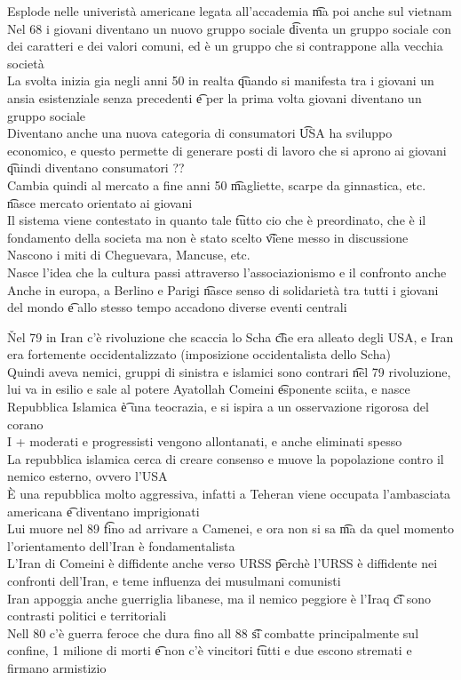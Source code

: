 \documentclass[12pt]{article}
\begin{document}
Esplode nelle univeristà americane legata all'accademia \t ma poi anche sul vietnam \\
Nel 68 i giovani diventano un nuovo gruppo sociale \t diventa un gruppo sociale con dei caratteri e dei valori comuni, ed è un gruppo che si contrappone alla vecchia società \\
La svolta inizia gia negli anni 50 in realta \t quando si manifesta tra i giovani un ansia esistenziale senza precedenti \t e per la prima volta giovani diventano un gruppo sociale \\
Diventano anche una nuova categoria di consumatori \t USA ha sviluppo economico, e questo permette di generare posti di lavoro che si aprono ai giovani \t quindi diventano consumatori ?? \\
Cambia quindi al mercato a fine anni 50 \t magliette, scarpe da ginnastica, etc. \t nasce mercato orientato ai giovani \\
Il sistema viene contestato in quanto tale \t tutto cio che è preordinato, che è il fondamento della societa ma non è stato scelto \t viene messo in discussione \\
Nascono i miti di Cheguevara, Mancuse, etc. \\
Nasce l'idea che la cultura passi attraverso l'associazionismo e il confronto anche \\
Anche in europa, a Berlino e Parigi \t nasce senso di solidarietà tra tutti i giovani del mondo \t e allo stesso tempo accadono diverse eventi centrali

\v

Nel 79 in Iran c'è rivoluzione che scaccia lo Scha \t che era alleato degli USA, e Iran era fortemente occidentalizzato (imposizione occidentalista dello Scha) \\
Quindi aveva nemici, gruppi di sinistra e islamici sono contrari \t nel 79 rivoluzione, lui va in esilio e sale al potere Ayatollah Comeini \t esponente sciita, e nasce Repubblica Islamica \t è una teocrazia, e si ispira a un osservazione rigorosa del corano \\
I + moderati e progressisti vengono allontanati, e anche eliminati spesso \\
La repubblica islamica cerca di creare consenso e muove la popolazione contro il nemico esterno, ovvero l'USA \\
È una repubblica molto aggressiva, infatti a Teheran viene occupata l'ambasciata americana \t e diventano imprigionati \\
Lui muore nel 89 \t fino ad arrivare a Camenei, e ora non si sa \t ma da quel momento l'orientamento dell'Iran è fondamentalista \\
L'Iran di Comeini è diffidente anche verso URSS \t perchè l'URSS è diffidente nei confronti dell'Iran, e teme influenza dei musulmani comunisti \\
Iran appoggia anche guerriglia libanese, ma il nemico peggiore è l'Iraq \t ci sono contrasti politici e territoriali \\
Nell 80 c'è guerra feroce che dura fino all 88 \t si combatte principalmente sul confine, 1 milione di morti \t e non c'è vincitori \t tutti e due escono stremati e firmano armistizio
\end{document}
